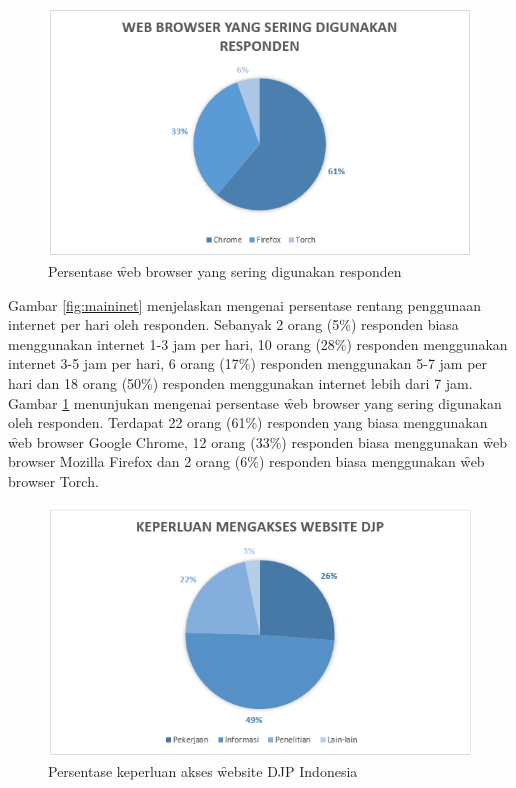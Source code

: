 \begin{figure}
	\centering
	\includegraphics[width=\textwidth]
	{pics/webfavorit.PNG}
	\caption{Persentase \f{web browser} yang sering digunakan responden}
	\label{fig:browser}
\end{figure}
\noindent
Gambar \ref{fig:maininet} menjelaskan mengenai persentase rentang penggunaan internet per hari oleh responden. Sebanyak 2 orang (5\%) responden biasa menggunakan internet 1-3 jam per hari, 10 orang (28\%) responden menggunakan internet 3-5 jam per hari, 6 orang (17\%) responden menggunakan 5-7 jam per hari dan 18 orang (50\%) responden menggunakan internet lebih dari 7 jam. Gambar \ref{fig:browser} menunjukan mengenai persentase \f{web browser} yang sering digunakan oleh responden. Terdapat 22 orang (61\%) responden yang biasa menggunakan \f{web browser Google Chrome}, 12 orang (33\%) responden biasa menggunakan \f{web browser Mozilla Firefox} dan 2 orang (6\%) responden biasa menggunakan \f{web browser Torch}.
\begin{figure}
	\centering
	\includegraphics[width=\textwidth]
	{pics/keperluanAkses.PNG}
	\caption{Persentase keperluan akses \f{website} DJP Indonesia}
	\label{fig:akses}
\end{figure}
